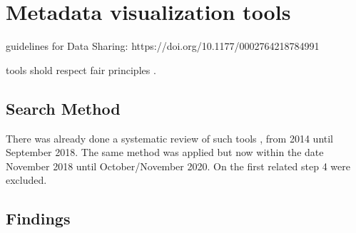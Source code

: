 \section{Metadata visualization tools}
guidelines for Data Sharing: https://doi.org/10.1177/0002764218784991

tools shold respect fair principles \cite{fair}.

\subsection{Search Method}

There was already done a systematic review of such tools \cite{systematic_review}, from
2014 until September 2018.  The same method was applied but now within the date
November 2018 until October/November 2020.  On the first related step 4 were excluded.

\subsection{Findings}

